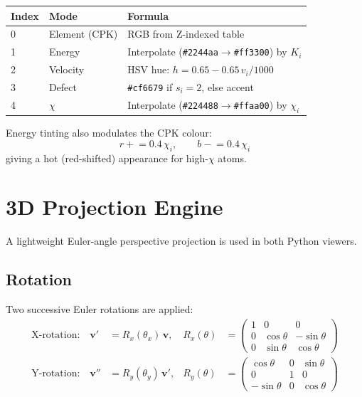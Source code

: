 ﻿\documentclass[11pt]{article}
\begin{document}
\begin{center}
\begin{tabular}{lll}
\toprule
Index & Mode & Formula \\
\midrule
0 & Element (CPK) & RGB from Z-indexed table \\
1 & Energy & Interpolate (\texttt{\#2244aa}$\to$\texttt{\#ff3300}) by $K_i$ \\
2 & Velocity & HSV hue: $h = 0.65 - 0.65\,v_i/1000$ \\
3 & Defect  & \texttt{\#cf6679} if $s_i=2$, else accent \\
4 & $\chi$ & Interpolate (\texttt{\#224488}$\to$\texttt{\#ffaa00}) by $\chi_i$ \\
\bottomrule
\end{tabular}
\end{center}

Energy tinting also modulates the CPK colour:
\begin{equation}
  r \mathrel{+}= 0.4\,\chi_i, \qquad b \mathrel{-}= 0.4\,\chi_i
\end{equation}
giving a hot (red-shifted) appearance for high-$\chi$ atoms.

\section{3D Projection Engine}
\label{sec:projection}

A lightweight Euler-angle perspective projection is used in both Python viewers.

\subsection{Rotation}

Two successive Euler rotations are applied:
\begin{align}
  \text{X-rotation:}\quad
  \mathbf{v}' &= R_x(\theta_x)\,\mathbf{v}, &
  R_x(\theta) &= \begin{pmatrix} 1 & 0 & 0 \\ 0 & \cos\theta & -\sin\theta \\ 0 & \sin\theta & \cos\theta \end{pmatrix} \\[6pt]
  \text{Y-rotation:}\quad
  \mathbf{v}'' &= R_y(\theta_y)\,\mathbf{v}', &
  R_y(\theta) &= \begin{pmatrix} \cos\theta & 0 & \sin\theta \\ 0 & 1 & 0 \\ -\sin\theta & 0 & \cos\theta \end{pmatrix}
\end{align}
\end{document}
